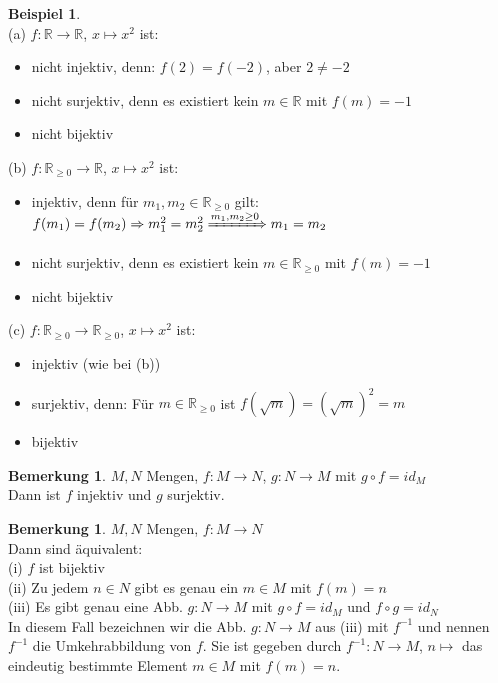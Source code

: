 \documentclass[10pt,a4paper,numbers=endperiod]{scrartcl}
\theoremstyle{definition}
\newtheorem{bem}[satz]{Bemerkung}
\newtheorem{bsp}[satz]{Beispiel}
\begin{document}
\begin{bsp}
	$ $ \\
	(a) $f: \mathbb{R} \rightarrow \mathbb{R}$, $x \mapsto x^{2}$ ist: 
	\begin{itemize}
		\item nicht injektiv, denn: $f(2) = f(-2)$, aber $2 \neq -2$
		\item nicht surjektiv, denn es existiert kein $m \in \mathbb{R}$ mit $f(m)=-1$
		\item nicht bijektiv\\
	\end{itemize}
	(b) $f: \mathbb{R}_{\geq 0} \rightarrow \mathbb{R}$, $x \mapsto x^{2}$ ist: 
	\begin{itemize}
		\item injektiv, denn für $m_1, m_2 \in \mathbb{R}_{\geq 0}$ gilt: $f(m_1)=f(m_2) \Rightarrow m_1^{2}=m_2^{2} \xRightarrow[]{m_1,m_2 \geq 0} m_1 = m_2$
		\item nicht surjektiv, denn es existiert kein $m \in \mathbb{R}_{\geq 0}$ mit $f(m) = -1$
		\item nicht bijektiv
	\end{itemize}
	(c) $f: \mathbb{R}_{\geq 0} \rightarrow \mathbb{R}_{\geq 0}$, $x \mapsto x^{2}$ ist:
	\begin{itemize}
		\item injektiv (wie bei (b))
		\item surjektiv, denn: Für $m \in \mathbb{R}_{\geq 0}$ ist $f(\sqrt{m})=(\sqrt{m})^{2} = m$
		\item bijektiv
	\end{itemize}
\end{bsp}

\begin{bem}
	$M,N$ Mengen, $f: M \rightarrow N$, $g: N \rightarrow M$ mit $g \circ f = id_M$\\
	Dann ist $f$ injektiv und $g$ surjektiv.
\end{bem}

\begin{bem}
	$M,N$ Mengen, $f:M \rightarrow N$\\
	Dann sind äquivalent:\\
	(i) $f$ ist bijektiv\\
	(ii) Zu jedem $n \in N$ gibt es genau ein $m \in M$ mit $f(m) = n$\\
	(iii) Es gibt genau eine Abb. $g: N \rightarrow M$ mit $g \circ f = id_M$ und $f \circ g = id_N$\\
	In diesem Fall bezeichnen wir die Abb. $g: N \rightarrow M$ aus (iii) mit $f^{-1}$ und nennen $f^{-1}$ die Umkehrabbildung von $f$. Sie ist gegeben durch $f^{-1}: N \rightarrow M$, $n \mapsto$ das eindeutig bestimmte Element $m \in M$ mit $f(m) = n$.
\end{bem}
\end{document}
